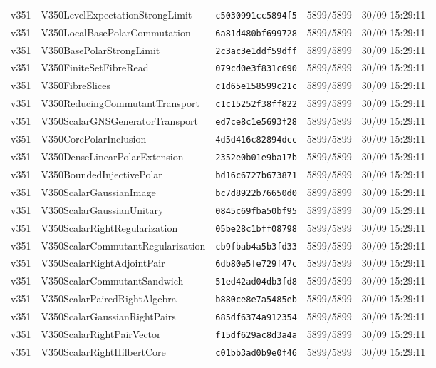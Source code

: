 \documentclass[11pt]{article}
\theoremstyle{definition}\newtheorem{deriv}{Derivation}
\begin{document}
{\begin{longtable}{@{}lllll@{}}
v351 & V350LevelExpectationStrongLimit & \texttt{c5030991cc5894f5} & 5899/5899 & 30/09 15:29:11 \\
v351 & V350LocalBasePolarCommutation & \texttt{6a81d480bf699728} & 5899/5899 & 30/09 15:29:11 \\
v351 & V350BasePolarStrongLimit & \texttt{2c3ac3e1ddf59dff} & 5899/5899 & 30/09 15:29:11 \\
v351 & V350FiniteSetFibreRead & \texttt{079cd0e3f831c690} & 5899/5899 & 30/09 15:29:11 \\
v351 & V350FibreSlices & \texttt{c1d65e158599c21c} & 5899/5899 & 30/09 15:29:11 \\
v351 & V350ReducingCommutantTransport & \texttt{c1c15252f38ff822} & 5899/5899 & 30/09 15:29:11 \\
v351 & V350ScalarGNSGeneratorTransport & \texttt{ed7ce8c1e5693f28} & 5899/5899 & 30/09 15:29:11 \\
v351 & V350CorePolarInclusion & \texttt{4d5d416c82894dcc} & 5899/5899 & 30/09 15:29:11 \\
v351 & V350DenseLinearPolarExtension & \texttt{2352e0b01e9ba17b} & 5899/5899 & 30/09 15:29:11 \\
v351 & V350BoundedInjectivePolar & \texttt{bd16c6727b673871} & 5899/5899 & 30/09 15:29:11 \\
v351 & V350ScalarGaussianImage & \texttt{bc7d8922b76650d0} & 5899/5899 & 30/09 15:29:11 \\
v351 & V350ScalarGaussianUnitary & \texttt{0845c69fba50bf95} & 5899/5899 & 30/09 15:29:11 \\
v351 & V350ScalarRightRegularization & \texttt{05be28c1bff08798} & 5899/5899 & 30/09 15:29:11 \\
v351 & V350ScalarCommutantRegularization & \texttt{cb9fbab4a5b3fd33} & 5899/5899 & 30/09 15:29:11 \\
v351 & V350ScalarRightAdjointPair & \texttt{6db80e5fe729f47c} & 5899/5899 & 30/09 15:29:11 \\
v351 & V350ScalarCommutantSandwich & \texttt{51ed42ad04db3fd8} & 5899/5899 & 30/09 15:29:11 \\
v351 & V350ScalarPairedRightAlgebra & \texttt{b880ce8e7a5485eb} & 5899/5899 & 30/09 15:29:11 \\
v351 & V350ScalarGaussianRightPairs & \texttt{685df6374a912354} & 5899/5899 & 30/09 15:29:11 \\
v351 & V350ScalarRightPairVector & \texttt{f15df629ac8d3a4a} & 5899/5899 & 30/09 15:29:11 \\
v351 & V350ScalarRightHilbertCore & \texttt{c01bb3ad0b9e0f46} & 5899/5899 & 30/09 15:29:11 \\

\end{longtable}}
\end{document}
